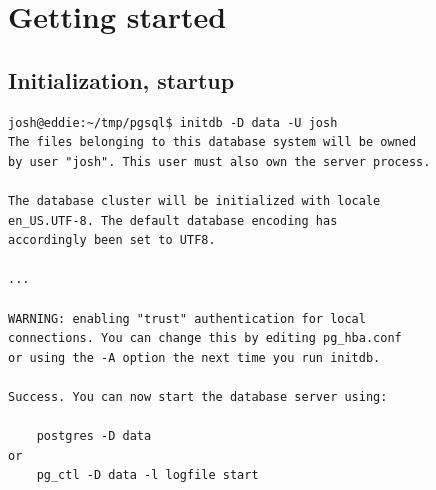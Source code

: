\documentclass[svgnames]{beamer}
\begin{document}
\section{Getting started}
\subsection{Initialization, startup}
%
%
%
%
%
%

\begin{frame}[fragile]
\small
    \begin{verbatim}
josh@eddie:~/tmp/pgsql$ initdb -D data -U josh
The files belonging to this database system will be owned
by user "josh". This user must also own the server process.
                        
The database cluster will be initialized with locale
en_US.UTF-8. The default database encoding has
accordingly been set to UTF8.

...

WARNING: enabling "trust" authentication for local
connections. You can change this by editing pg_hba.conf
or using the -A option the next time you run initdb.

Success. You can now start the database server using:

    postgres -D data
or  
    pg_ctl -D data -l logfile start
    \end{verbatim}
\normalsize
\end{frame}
\end{document}
